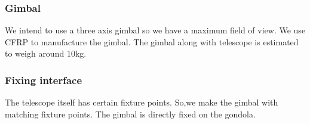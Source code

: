 \subsubsection{Gimbal}
\label {sec:4.4.3}
We intend to use a three axis gimbal so we have a maximum field of view. We use CFRP to manufacture the gimbal. The gimbal along with telescope is estimated to weigh around 10kg.



\subsubsection{Fixing interface}
\label {sec:4.4.5}
The telescope itself has certain fixture points. So,we make the gimbal with matching fixture points. The gimbal is directly fixed on the gondola.